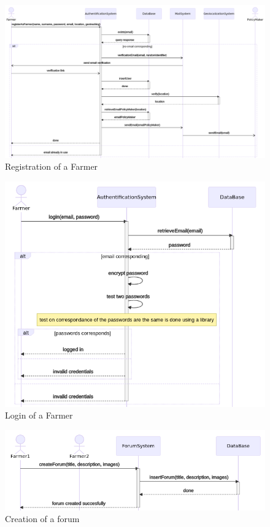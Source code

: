 \begin{figure} [!h]
	\centering
	\includegraphics[width=\textwidth]{Images/seq_registration.png}
	\caption{\label{fig:seq_registration} Registration of a Farmer}
\end{figure}

\begin{figure} [!h]
	\centering
	\includegraphics[width=\textwidth]{Images/seq_login.png}
	\caption{\label{fig:seq_login} Login of a Farmer}
\end{figure}

\begin{figure} [!h]
	\centering
	\includegraphics[width=\textwidth]{Images/seq_forum_creation.png}
	\caption{\label{fig:seq_crea_forum} Creation of a forum}
\end{figure}

